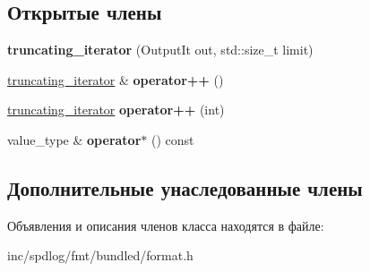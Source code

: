 \subsection*{Открытые члены}
\begin{DoxyCompactItemize}
\item 
\mbox{\label{classinternal_1_1truncating__iterator_3_01OutputIt_00_01std_1_1false__type_01_4_a852c34238f920b986216b598eb054612}} 
{\bfseries truncating\+\_\+iterator} (Output\+It out, std\+::size\+\_\+t limit)
\item 
\mbox{\label{classinternal_1_1truncating__iterator_3_01OutputIt_00_01std_1_1false__type_01_4_a35376bd0b2e8a1f9ee184008d4c10468}} 
\hyperlink{classinternal_1_1truncating__iterator}{truncating\+\_\+iterator} \& {\bfseries operator++} ()
\item 
\mbox{\label{classinternal_1_1truncating__iterator_3_01OutputIt_00_01std_1_1false__type_01_4_a9ba2299a0cd4c3938582d135ff3092a9}} 
\hyperlink{classinternal_1_1truncating__iterator}{truncating\+\_\+iterator} {\bfseries operator++} (int)
\item 
\mbox{\label{classinternal_1_1truncating__iterator_3_01OutputIt_00_01std_1_1false__type_01_4_ab82a20d9b1cca826e7c84f3984f69adf}} 
value\+\_\+type \& {\bfseries operator$\ast$} () const
\end{DoxyCompactItemize}
\subsection*{Дополнительные унаследованные члены}


Объявления и описания членов класса находятся в файле\+:\begin{DoxyCompactItemize}
\item 
inc/spdlog/fmt/bundled/format.\+h\end{DoxyCompactItemize}
